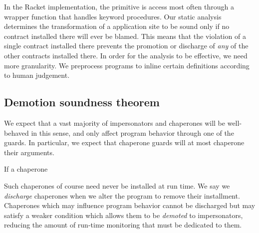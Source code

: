 \documentclass{sigplanconf}
\begin{document}

In the Racket implementation, the  primitive is access most often through a wrapper function that handles keyword procedures.
Our static analysis determines the transformation of a  application site to be sound only if no contract installed there will ever be blamed.
This means that the violation of a single contract installed there prevents the promotion or discharge of \emph{any} of the other contracts installed there.
In order for the analysis to be effective, we need more granularity.
We preprocess programs to inline certain definitions according to human judgement.

\subsection{Demotion soundness theorem}





We expect that a vast majority of impersonators and chaperones will be well-behaved in this sense, and only affect program behavior through one of the guards.
In particular, we expect that chaperone guards will at most chaperone their arguments.







If a chaperone 



Such chaperones of course need never be installed at run time.
We say we \emph{discharge} chaperones when we alter the program to remove their installment.
Chaperones which may influence program behavior cannot be discharged but may satisfy a weaker condition which allows them to be \emph{demoted} to impersonators, reducing the amount of run-time monitoring that must be dedicated to them.
\end{document}
